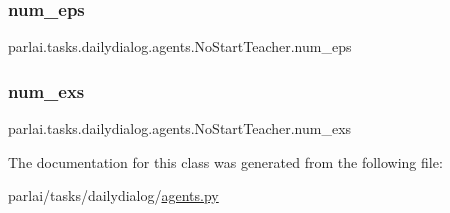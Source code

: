 \subsubsection{\texorpdfstring{num\+\_\+eps}{num\_eps}}
{\footnotesize\ttfamily parlai.\+tasks.\+dailydialog.\+agents.\+No\+Start\+Teacher.\+num\+\_\+eps}

\mbox{\label{classparlai_1_1tasks_1_1dailydialog_1_1agents_1_1NoStartTeacher_aab39a1a4cec18469e61f2431e85b6fd1}} 
\subsubsection{\texorpdfstring{num\+\_\+exs}{num\_exs}}
{\footnotesize\ttfamily parlai.\+tasks.\+dailydialog.\+agents.\+No\+Start\+Teacher.\+num\+\_\+exs}



The documentation for this class was generated from the following file\+:\begin{DoxyCompactItemize}
\item 
parlai/tasks/dailydialog/\hyperlink{parlai_2tasks_2dailydialog_2agents_8py}{agents.\+py}\end{DoxyCompactItemize}
